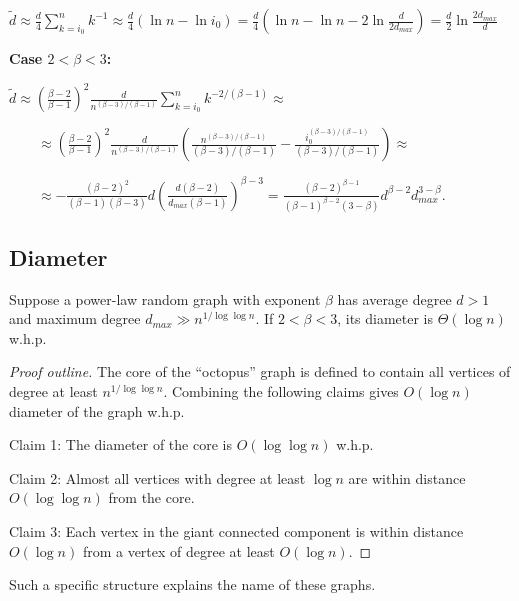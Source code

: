 $\tilde{d}\approx\frac{d}{4}\sum_{k=i_0}^{n}{k^{-1}}\approx\frac{d}{4}(\ln n-\ln i_0)
=\frac{d}{4}(\ln n-\ln n-2\ln\frac{d}{2d_{max}})=\frac{d}{2}\ln\frac{2d_{max}}{d}$

\textbf{Case $2<\beta<3$:}

$\tilde{d}\approx\left(\frac{\beta-2}{\beta-1}\right)^2\frac{d}{n^{(\beta-3)/(\beta-1)}}
\sum_{k=i_0}^{n}{k^{-2/(\beta-1)}}\approx$

$\qquad\approx\left(\frac{\beta-2}{\beta-1}\right)^2\frac{d}{n^{(\beta-3)/(\beta-1)}}
\left(\frac{n^{(\beta-3)/(\beta-1)}}{(\beta-3)/(\beta-1)}
    -\frac{i_0^{(\beta-3)/(\beta-1)}}{(\beta-3)/(\beta-1)}
\right)\approx$

$\qquad\approx-\frac{(\beta-2)^2}{(\beta-1)(\beta-3)}d
\left(\frac{d(\beta-2)}{d_{max}(\beta-1)}\right)^{\beta-3}
=\frac{(\beta-2)^{\beta-1}}{(\beta-1)^{\beta-2}(3-\beta)}
d^{\beta-2}d_{max}^{3-\beta}$.

\subsection{Diameter}

\begin{theorem}
    Suppose a power-law random graph with exponent $\beta$ has average degree $d>1$
    and maximum degree $d_{max}\gg n^{1/\log\log n}$.
    If $2<\beta<3$, its diameter is $\Theta(\log n)$ w.h.p.
\end{theorem}

\begin{proof}[Proof outline]
    The core of the ``octopus'' graph is defined to contain all vertices of degree
    at least $n^{1/\log\log n}$.
    Combining the following claims gives $O(\log n)$ diameter of the graph w.h.p.
    
    Claim 1: The diameter of the core is $O(\log\log n)$ w.h.p.
    
    Claim 2: Almost all vertices with degree at least $\log n$ are
    within distance $O(\log\log n)$ from the core.
    
    Claim 3: Each vertex in the giant connected component is within distance
    $O(\log n)$ from a vertex of degree at least $O(\log n)$.
\end{proof}

Such a specific structure explains the name of these graphs.

%
%
